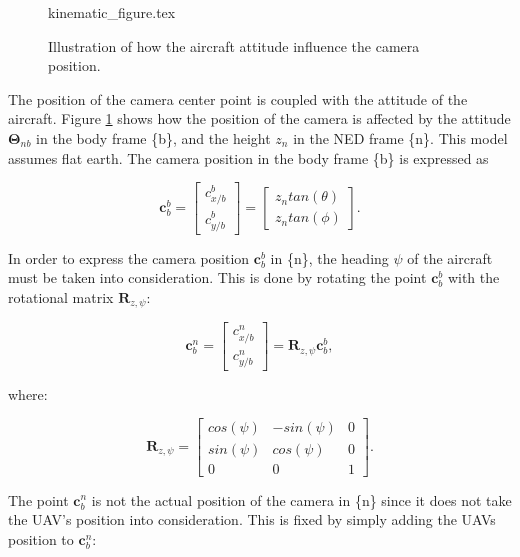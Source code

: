 \begin{figure}
	{kinematic_figure.tex}
	\caption{Illustration of how the aircraft attitude influence the camera position.}
	\label{fig:camera_kinematics}
\end{figure}
	
The position of the camera center point is coupled with the attitude of the aircraft. Figure \ref{fig:camera_kinematics} shows how the position of the camera is affected by the attitude $\bm{\Theta}_{nb}$ in the body frame \{b\}, and the height $z_n$ in the NED frame \{n\}. This model assumes flat earth. The camera position in the body frame \{b\} is expressed as

\begin{equation} \label{eq:camera_pos}
	\bm{c}_b^b =
	\begin{bmatrix}
		c_{x/b}^b \\
		c_{y/b}^b
	\end{bmatrix}
	=
	\begin{bmatrix}
		z_n tan(\theta) \\
		z_n tan(\phi)
	\end{bmatrix}.
\end{equation}

In order to express the camera position $\bm{c}_b^b$ in \{n\}, the heading $\psi$ of the aircraft must be taken into consideration. This is done by rotating the point $\bm{c}_b^b$ with the rotational matrix $\bm{R}_{z,\psi}$:

\begin{equation} \label{eq:body_ned_rotate}
	\bm{c}_b^n =
	\begin{bmatrix}
		c_{x/b}^n \\
		c_{y/b}^n
	\end{bmatrix}
	= \bm{R}_{z,\psi} \bm{c}_b^b,
\end{equation}

where:

\begin{equation}
	\bm{R}_{z,\psi} = 
	\begin{bmatrix}
		cos(\psi) & -sin(\psi) & 0 \\
		sin(\psi) & cos(\psi) & 0 \\
		0 & 0 & 1
	\end{bmatrix}.
\end{equation}

The point $\bm{c}_b^n$ is not the actual position of the camera in \{n\} since it does not take the UAV's position into consideration. This is fixed by simply adding the UAVs position to $\bm{c}_b^n$:

